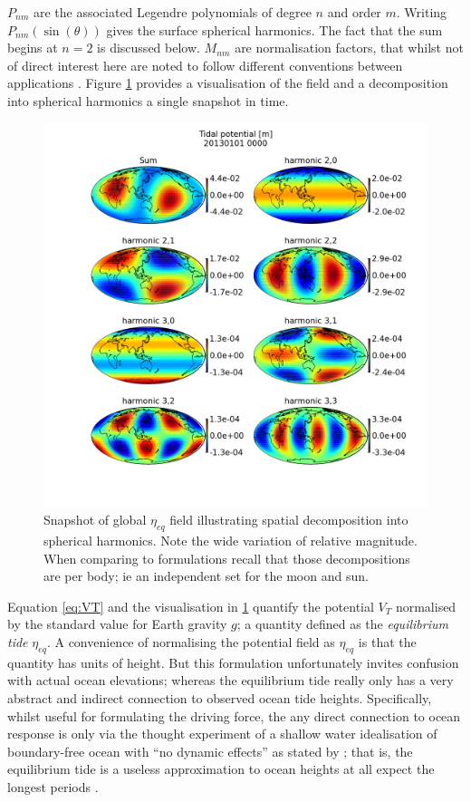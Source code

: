 $P_{nm}$ are the associated Legendre polynomials of degree $n$ and order $m$.  Writing $P_{nm}(\sin(\theta))$ gives the surface spherical harmonics.  The fact that the sum begins at $n=2$ is discussed below.
$M_{nm}$ are normalisation factors, that whilst not of direct interest here are noted to follow different conventions between applications \citep{IERS2003}.
Figure \ref{fig:VTmaps} provides a visualisation of the field and a decomposition into spherical harmonics a single snapshot in time.
\begin{figure}[h]
    \begin{center}
    \includegraphics[width=\figwidthBig]{figures/maps/tidal_potential_spatial_20130101_0000.png}
    \caption{Snapshot of global $\eta_{eq}$ field illustrating spatial decomposition into spherical harmonics.  Note the wide variation of relative magnitude. When comparing to formulations recall that those decompositions are per body; ie an independent set for the moon and sun. }
    \label{fig:VTmaps}
    \end{center}
\end{figure}
Equation \ref{eq:VT} and the visualisation in \ref{fig:VTmaps} quantify the potential $V_T$ normalised by the standard value for Earth gravity $g$; a quantity defined as the \emph{equilibrium tide} $\eta_{eq}$.  
A convenience of normalising the potential field as $\eta_{eq}$ is that the quantity has units of height. But this formulation unfortunately invites confusion with actual ocean elevations; whereas the equilibrium tide really only has a very abstract and indirect connection to observed ocean tide heights.
Specifically, whilst useful for formulating the driving force, the any direct connection to ocean response is only via the thought experiment of a shallow water idealisation of boundary-free ocean with ``no dynamic effects'' as stated by \cite[Eq 9.8.3]{gill1982atmosphere}; that is, the equilibrium tide is a useless approximation to ocean heights at all expect the longest periods \cite{Egbert:2003jd}.



